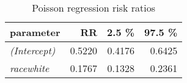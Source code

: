 \begin{wraptable}{r}{3.5in}

\caption{\label{tab:poisson_reg_RR}Poisson regression risk ratios}
\centering
\fontsize{9}{11}\selectfont
\begin{tabular}[t]{>{}lrrr}
\toprule
parameter & RR & 2.5 \% & 97.5 \%\\
\midrule
\em{(Intercept)} & 0.5220 & 0.4176 & 0.6425\\
\em{racewhite} & 0.1767 & 0.1328 & 0.2361\\
\bottomrule
\end{tabular}
\end{wraptable}
